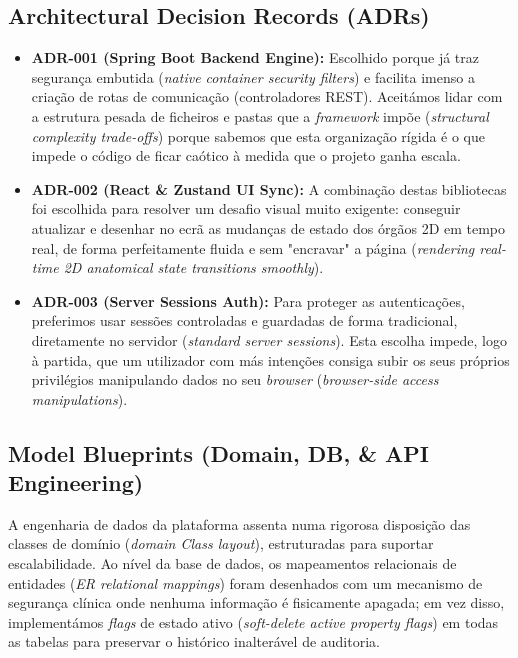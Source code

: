 \documentclass[11pt,a4paper]{article}
\begin{document}
\subsection{Architectural Decision Records (ADRs)}
\begin{itemize}[label=\color{accentblue}$\bullet$]
    \item \textbf{\textnormal{ADR-001} (Spring Boot Backend Engine):} Escolhido porque já traz segurança embutida (\textit{native container security filters}) e facilita imenso a criação de rotas de comunicação (controladores REST). Aceitámos lidar com a estrutura pesada de ficheiros e pastas que a \textit{framework} impõe (\textit{structural complexity trade-offs}) porque sabemos que esta organização rígida é o que impede o código de ficar caótico à medida que o projeto ganha escala.
    \item \textbf{\textnormal{ADR-002} (React \& Zustand UI Sync):} A combinação destas bibliotecas foi escolhida para resolver um desafio visual muito exigente: conseguir atualizar e desenhar no ecrã as mudanças de estado dos órgãos 2D em tempo real, de forma perfeitamente fluida e sem "encravar" a página (\textit{rendering real-time 2D anatomical state transitions smoothly}).
    \item \textbf{\textnormal{ADR-003} (Server Sessions Auth):} Para proteger as autenticações, preferimos usar sessões controladas e guardadas de forma tradicional, diretamente no servidor (\textit{standard server sessions}). Esta escolha impede, logo à partida, que um utilizador com más intenções consiga subir os seus próprios privilégios manipulando dados no seu \textit{browser} (\textit{browser-side access manipulations}).
\end{itemize}

\subsection{Model Blueprints (Domain, DB, \& API Engineering)}
A engenharia de dados da plataforma assenta numa rigorosa disposição das classes de domínio (\textit{domain Class layout}), estruturadas para suportar escalabilidade. Ao nível da base de dados, os mapeamentos relacionais de entidades (\textit{ER relational mappings}) foram desenhados com um mecanismo de segurança clínica onde nenhuma informação é fisicamente apagada; em vez disso, implementámos \textit{flags} de estado ativo (\textit{soft-delete active property flags}) em todas as tabelas para preservar o histórico inalterável de auditoria. 
\end{document}
